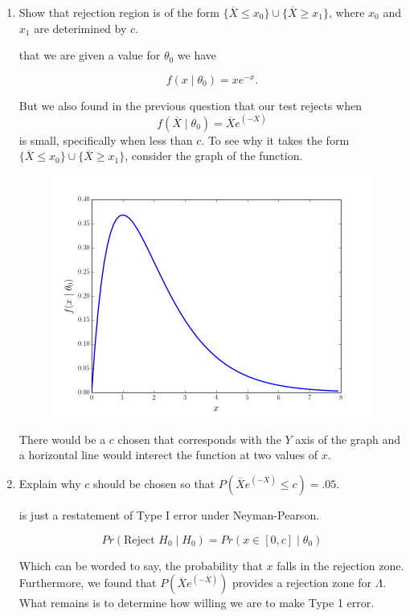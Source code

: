 \documentclass{tufte-book}
\theoremstyle{mytheoremstyle}
\theoremstyle{mylemstyle}
\theoremstyle{mydefstyle}
\begin{document}
\begin{enumerate}

\item Show that rejection region is of the form $\{\overline{X} \leq x_0\} \cup \{ \overline{X} \geq x_1 \}$, where $x_0$ and $x_1$ are deterimined by $c$.

 that we are given a value for $\theta_0$ we have

\[ f(x\mid \theta_0) = xe^{-x}. \]

But we also found in the previous question that our test rejects when
\[ f(\overline{X} \mid \theta_0) = \overline{X} e^{(-\overline{X})} \]
is small, specifically when less than $c$.  To see why it takes the form
$\{\overline{X} \leq x_0\} \cup \{ \overline{X} \geq x_1 \}$, consider the graph of the function.

\begin{figure}
\includegraphics{q3}
\caption{}
\end{figure}

There would be a $c$ chosen that corresponds with the $Y$ axis of the graph and a horizontal line would interect the function at two values of $x$.

\item Explain why $c$ should be chosen so that $P(\overline{X} e^{(-\overline{X})} \leq c) = .05$.

 is just a restatement of Type I error under Neyman-Pearson.

\[Pr(\text{Reject }H_0 \mid H_0) = Pr(x \in [0, c] \mid \theta_0) \]

Which can be worded to say, the probability that $x$ falls in the rejection zone.  Furthermore, we found that $P(\overline{X} e^{(-\overline{X})})$ provides a rejection zone for $\Lambda$.  What remains is to determine how willing we are to make Type 1 error.


\end{enumerate}
\end{document}
